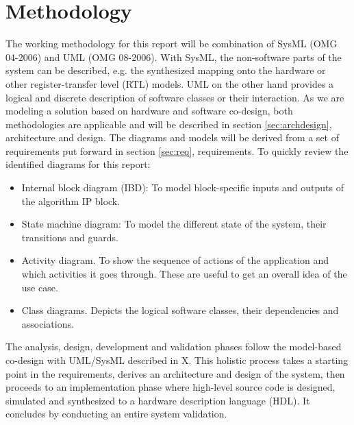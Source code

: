 \section{Methodology}

The working methodology for this report will be combination of SysML \cite{sysml}(OMG 04-2006) and UML \cite{uml} (OMG 08-2006). With SysML, the non-software parts of the system can be described, e.g. the synthesized mapping onto the hardware or other register-transfer level (RTL) models. UML on the other hand provides a logical and discrete description of software classes or their interaction. As we are modeling a solution based on hardware and software co-design, both methodologies are applicable and will be described in section \ref{sec:archdesign}, architecture and design. The diagrams and models will be derived from a set of requirements put forward in section \ref{sec:req}, requirements. To quickly review the identified diagrams for this report:

\begin{itemize}
	\item Internal block diagram (IBD): To model block-specific inputs and outputs of the algorithm IP block.
	\item State machine diagram: To model the different state of the system, their transitions and guards.
	\item Activity diagram. To show the sequence of actions of the application and which activities it goes through. These are useful to get an overall idea of the use case.
	\item Class diagrams. Depicts the logical software classes, their dependencies and associations.
\end{itemize}

The analysis, design, development and validation phases follow the model-based co-design with UML/SysML described in X. This holistic process takes a starting point in the requirements, derives an architecture and design of the system, then proceeds to an implementation phase where high-level source code is designed, simulated and synthesized to a hardware description language (HDL). It concludes by conducting an entire system validation.

